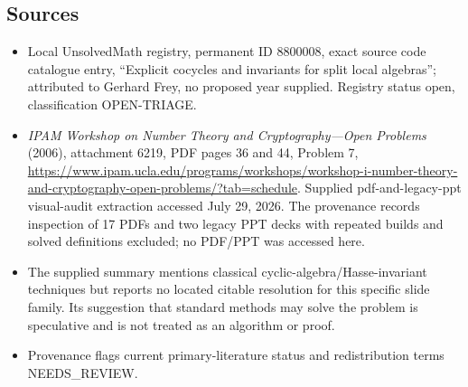 \documentclass[11pt]{article}
\begin{document}
\subsection{Sources}
\begin{itemize}
\item Local UnsolvedMath registry, permanent ID 8800008, exact source code catalogue entry, ``Explicit cocycles and invariants for split local algebras''; attributed to Gerhard Frey, no proposed year supplied. Registry status open, classification OPEN-TRIAGE.
\item \emph{IPAM Workshop on Number Theory and Cryptography---Open Problems} (2006), attachment 6219, PDF pages 36 and 44, Problem 7, \url{https://www.ipam.ucla.edu/programs/workshops/workshop-i-number-theory-and-cryptography-open-problems/?tab=schedule}. Supplied pdf-and-legacy-ppt visual-audit extraction accessed July 29, 2026. The provenance records inspection of 17 PDFs and two legacy PPT decks with repeated builds and solved definitions excluded; no PDF/PPT was accessed here.
\item The supplied summary mentions classical cyclic-algebra/Hasse-invariant techniques but reports no located citable resolution for this specific slide family. Its suggestion that standard methods may solve the problem is speculative and is not treated as an algorithm or proof.
\item Provenance flags current primary-literature status and redistribution terms NEEDS\_REVIEW.
\end{itemize}
\end{document}
